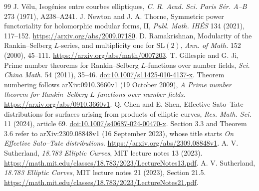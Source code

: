 \documentclass[11pt]{article}
\theoremstyle{definition}\newtheorem{definition}[theorem]{Definition}
\begin{document}
\begin{thebibliography}{99}
J. V\'elu, Isog\'enies entre courbes elliptiques,
\emph{C. R. Acad. Sci. Paris S\'er. A--B} 273 (1971), A238--A241.
J. Newton and J. A. Thorne, Symmetric power functoriality
for holomorphic modular forms, II,
\emph{Publ. Math. IH\'ES} 134 (2021), 117--152.
\url{https://arxiv.org/abs/2009.07180}.
D. Ramakrishnan, Modularity of the Rankin--Selberg
$L$-series, and multiplicity one for $\mathrm{SL}(2)$,
\emph{Ann. of Math.} 152 (2000), 45--111.
\url{https://arxiv.org/abs/math/0007203}.
T. Gillespie and G. Ji, Prime number theorems for
Rankin--Selberg $L$-functions over number fields,
\emph{Sci. China Math.} 54 (2011), 35--46.
\href{https://doi.org/10.1007/s11425-010-4137-x}{doi:10.1007/s11425-010-4137-x}.
Theorem numbering follows arXiv:0910.3660v1 (19 October 2009),
\emph{A Prime number theorem for Rankin--Selberg $L$-functions
over number fields}. \url{https://arxiv.org/abs/0910.3660v1}.
Q. Chen and E. Shen, Effective Sato--Tate distributions
for surfaces arising from products of elliptic curves,
\emph{Res. Math. Sci.} 11 (2024), article 69.
\href{https://doi.org/10.1007/s40687-024-00470-x}{doi:10.1007/s40687-024-00470-x}.
Section 3.3 and Theorem 3.6 refer to arXiv:2309.08848v1
(16 September 2023), whose title starts \emph{On Effective
Sato--Tate distributions}. \url{https://arxiv.org/abs/2309.08848v1}.
A. V. Sutherland, \emph{18.783 Elliptic Curves},
MIT lecture notes 13 (2023).
\url{https://math.mit.edu/classes/18.783/2023/LectureNotes13.pdf}.
A. V. Sutherland, \emph{18.783 Elliptic Curves},
MIT lecture notes 21 (2023), Section 21.5.
\url{https://math.mit.edu/classes/18.783/2023/LectureNotes21.pdf}.
\end{thebibliography}
\end{document}
